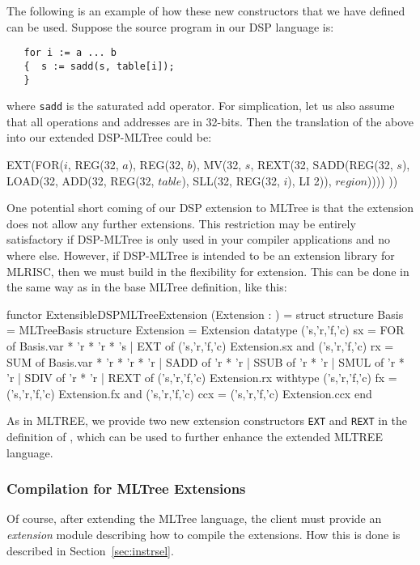 The following is an example of how these new constructors that we have defined can be used.  Suppose the source program in our DSP language is:
\begin{verbatim}
   for i := a ... b
   {  s := sadd(s, table[i]);
   }
\end{verbatim}
\noindent where \verb|sadd| is the saturated add operator.
For simplication, let us also assume that all operations and addresses
are in 32-bits.
Then the translation of the above into our extended DSP-MLTree could be:
\begin{SML}
   EXT(FOR(\(i\), REG(32, \(a\)), REG(32, \(b\)),
           MV(32, \(s\), REXT(32, SADD(REG(32, \(s\)), 
                LOAD(32, 
                    ADD(32, REG(32, \(table\)), 
                        SLL(32, REG(32, \(i\)), LI 2)),
                         \(region\)))))
          ))
\end{SML}

One potential short coming of our DSP extension to MLTree is that
the extension does not allow any further extensions.  This restriction
may be entirely satisfactory if DSP-MLTree is only used in your compiler
applications and no where else.  However, if DSP-MLTree is intended
to be an extension library for MLRISC, then  we must build in the flexibility
for extension.  This can be done in the same way as in the base MLTree
definition, like this: 
\begin{SML}
functor ExtensibleDSPMLTreeExtension
  (Extension : ) =
struct
   structure Basis = MLTreeBasis
   structure Extension = Extension
   datatype ('s,'r,'f,'c) sx = 
      FOR of Basis.var * 'r * 'r * 's
    | EXT of ('s,'r,'f,'c) Extension.sx 
   and ('s,'r,'f,'c) rx = 
      SUM of Basis.var * 'r * 'r * 'r
    | SADD of 'r * 'r
    | SSUB of 'r * 'r
    | SMUL of 'r * 'r
    | SDIV of 'r * 'r
    | REXT of ('s,'r,'f,'c) Extension.rx
   withtype
        ('s,'r,'f,'c) fx   = ('s,'r,'f,'c) Extension.fx
   and  ('s,'r,'f,'c) ccx  = ('s,'r,'f,'c) Extension.ccx
end
\end{SML}

As in MLTREE, we provide two new extension 
constructors \verb|EXT| and \verb|REXT| in
the definition of , which  can 
be used to further enhance the extended MLTREE language.

\subsubsection{Compilation for MLTree Extensions}
Of course, after extending the MLTree language, the client must provide
an \emph{extension} module describing how to compile the extensions.
How this is done is described in Section~\ref{sec:instrsel}.

